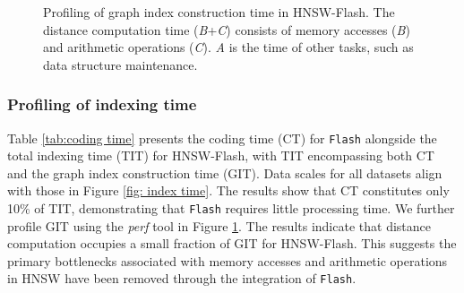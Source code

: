\begin{table}[t]
 \fontsize{7.5pt}{4mm}\selectfont
  \caption{Coding time (CT) and total indexing time (TIT).}
  \vspace{-0.4cm}
  \label{tab:coding time}
  \vspace{-0.3cm}
\end{table}

\begin{figure}
  \setlength{\abovecaptionskip}{0cm}
  \setlength{\belowcaptionskip}{-0.4cm}
  \centering
  \footnotesize
  \hspace{0.15cm}
  \newline
  \caption{Profiling of graph index construction time in HNSW-Flash. The distance computation time (\textit{B}+\textit{C}) consists of memory accesses (\textit{B}) and arithmetic operations (\textit{C}). \textit{A} is the time of other tasks, such as data structure maintenance.}
  \label{fig: graph construction time profile}
  \vspace{-0.1cm}
\end{figure}

\subsubsection{\textbf{Profiling of indexing time}}
Table \ref{tab:coding time} presents the coding time (CT) for \texttt{Flash} alongside the total indexing time (TIT) for HNSW-Flash, with TIT encompassing both CT and the graph index construction time (GIT). Data scales for all datasets align with those in Figure \ref{fig: index time}.
The results show that CT constitutes only 10\% of TIT, demonstrating that \texttt{Flash} requires little processing time. We further profile GIT using the \textit{perf} tool in Figure \ref{fig: graph construction time profile}. The results indicate that distance computation occupies a small fraction of GIT for HNSW-Flash. This suggests the primary bottlenecks associated with memory accesses and arithmetic operations in HNSW have been removed through the integration of \texttt{Flash}.

